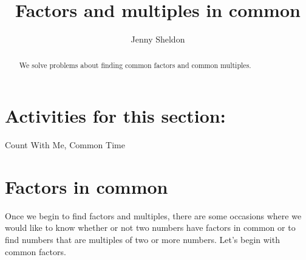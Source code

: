 \documentclass{ximera}
\title{Factors and multiples in common}
\author{Jenny Sheldon}
\begin{document}
\begin{abstract}
We solve problems about finding common factors and common multiples.
\end{abstract}
\maketitle

\section{Activities for this section:} Count With Me, Common Time

\section{Factors in common}

Once we begin to find factors and multiples, there are some occasions where we would like to know whether or not two numbers have factors in common or to find numbers that are multiples of two or more numbers. Let's begin with common factors.
\end{document}
